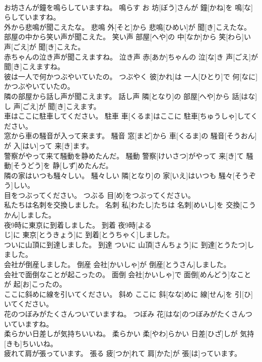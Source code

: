 \documentclass[8pt]{extreport}
\begin{document}
\begin{CJK}{UTF8}{min}
\\	お坊さんが鐘を鳴らしていますね。	鳴らす	お 坊[ぼう]さんが 鐘[かね]を 鳴[な]らしていますね。	
\\	外から悲鳴が聞こえたな。	悲鳴	外[そと]から 悲鳴[ひめい]が 聞[き]こえたな。	
\\	部屋の中から笑い声が聞こえた。	笑い声	部屋[へや]の 中[なか]から 笑[わら]い 声[ごえ]が 聞[き]こえた。	
\\	赤ちゃんの泣き声が聞こえますね。	泣き声	赤[あか]ちゃんの 泣[な]き 声[ごえ]が 聞[き]こえますね。	
\\	彼は一人で何かつぶやいていたの。	つぶやく	彼[かれ]は 一人[ひとり]で 何[なに]かつぶやいていたの。	
\\	隣の部屋から話し声が聞こえます。	話し声	隣[となり]の 部屋[へや]から 話[はな]し 声[ごえ]が 聞[き]こえます。	
\\	車はここに駐車してください。	駐車	車[くるま]はここに 駐車[ちゅうしゃ]してください。	
\\	窓から車の騒音が入って来ます。	騒音	窓[まど]から 車[くるま]の 騒音[そうおん]が 入[はい]って 来[き]ます。	
\\	警察がやって来て騒動を静めたんだ。	騒動	警察[けいさつ]がやって 来[き]て 騒動[そうどう]を 静[しず]めたんだ。	
\\	隣の家はいつも騒々しい。	騒々しい	隣[となり]の 家[いえ]はいつも 騒々[そうぞう]しい。	
\\	目をつぶってください。	つぶる	目[め]をつぶってください。	
\\	私たちは名刺を交換しました。	名刺	私[わたし]たちは 名刺[めいし]を 交換[こうかん]しました。	
\\	夜9時に東京に到着しました。	到着	夜9時[よる 
\\	じ]に 東京[とうきょう]に 到着[とうちゃく]しました。	
\\	ついに山頂に到達しました。	到達	ついに 山頂[さんちょう]に 到達[とうたつ]しました。	
\\	会社が倒産しました。	倒産	会社[かいしゃ]が 倒産[とうさん]しました。	
\\	会社で面倒なことが起こったの。	面倒	会社[かいしゃ]で 面倒[めんどう]なことが 起[お]こったの。	
\\	ここに斜めに線を引いてください。	斜め	ここに 斜[なな]めに 線[せん]を 引[ひ]いてください。	
\\	花のつぼみがたくさんついていますね。	つぼみ	花[はな]のつぼみがたくさんついていますね。	
\\	柔らかい日差しが気持ちいいね。	柔らかい	柔[やわ]らかい 日差[ひざ]しが 気持[きも]ちいいね。	
\\	疲れて肩が張っています。	張る	疲[つか]れて 肩[かた]が 張[は]っています。	

\end{CJK}
\end{document}
